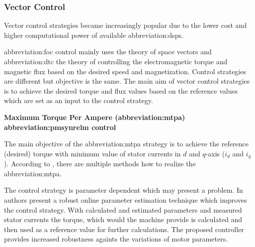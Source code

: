 \documentclass[a4paper, twoside, 11pt]{article}
\begin{document}
        \subsubsection{Vector Control}
            Vector control strategies became increasingly popular due to the lower cost and higher computational power of available \gls{abbreviation:dsp}s. \cite{dwivedi-review-on-control-strategies-of-permanent-magnet-assisted-synchronous-reluctance-motor-drive}
            \par
            \gls{abbreviation:foc} control mainly uses the theory of space vectors and \gls{abbreviation:dtc} the theory of controlling the electromagnetic torque and magnetic flux based on the desired speed and magnetization. Control strategies are different but objective is the same. The main aim of vector control strategies is to achieve the desired torque and flux values based on the reference values which are set as an input to the control strategy. \cite{heidari-a-review-of-synchronour-relucatence-motor-drive-advancements, dwivedi-review-on-control-strategies-of-permanent-magnet-assisted-synchronous-reluctance-motor-drive}
            
            \vspace*{1.5cm}
             \hspace*{-\parindent} \textbf{Maximum Torque Per Ampere (\gls{abbreviation:mtpa}) \gls{abbreviation:pmsynrelm} control}\par
                \hspace*{\parindent} The main objective of the \gls{abbreviation:mtpa} strategy is to achieve the reference (desired) torque with minimum value of stator currents in $d$ and $q$-axis ($i_d$ and $i_q$). According to \cite{dwivedi-review-on-control-strategies-of-permanent-magnet-assisted-synchronous-reluctance-motor-drive}, there are multiple methods how to realize the \gls{abbreviation:mtpa}.\par
                The control strategy is parameter dependent which may present a problem. In \cite{niazi-robust-maximum-torque-per-ampere-control-of-pmsynrelm} authors present a robust online parameter estimation technique which improves the control strategy. With calculated and estimated parameters and measured stator currents the torque, which would the machine provide is calculated and then used as a reference value for further calculations. The proposed controller provides increased robustness againts the variations of motor parameters.
\end{document}
